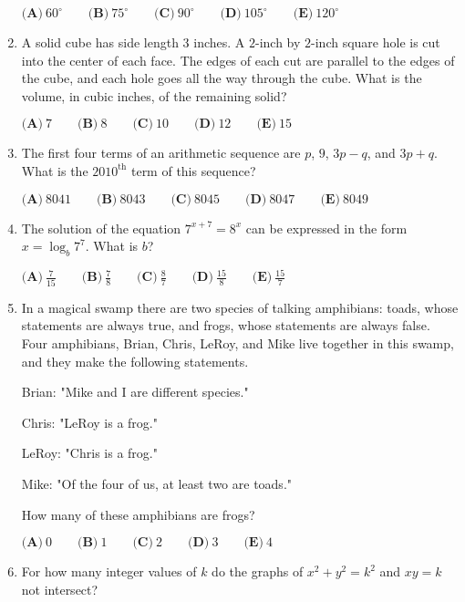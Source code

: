 \documentclass{article}
\begin{document}
\begin{enumerate}[label=\arabic*., itemsep=0.5em]
$\textbf{(A)}\ 60^\circ \qquad \textbf{(B)}\ 75^\circ \qquad \textbf{(C)}\ 90^\circ \qquad \textbf{(D)}\ 105^\circ \qquad \textbf{(E)}\ 120^\circ$\par \vspace{0.5em}\item A solid cube has side length $3$ inches. A $2$-inch by $2$-inch square hole is cut into the center of each face. The edges of each cut are parallel to the edges of the cube, and each hole goes all the way through the cube. What is the volume, in cubic inches, of the remaining solid?

$\textbf{(A)}\ 7 \qquad \textbf{(B)}\ 8 \qquad \textbf{(C)}\ 10 \qquad \textbf{(D)}\ 12 \qquad \textbf{(E)}\ 15$\par \vspace{0.5em}\item The first four terms of an arithmetic sequence are $p$, $9$, $3p-q$, and $3p+q$. What is the $2010^\text{th}$ term of this sequence?

$\textbf{(A)}\ 8041 \qquad \textbf{(B)}\ 8043 \qquad \textbf{(C)}\ 8045 \qquad \textbf{(D)}\ 8047 \qquad \textbf{(E)}\ 8049$\par \vspace{0.5em}\item The solution of the equation $7^{x+7} = 8^x$ can be expressed in the form $x = \log_b 7^7$. What is $b$?

$\textbf{(A)}\ \frac{7}{15} \qquad \textbf{(B)}\ \frac{7}{8} \qquad \textbf{(C)}\ \frac{8}{7} \qquad \textbf{(D)}\ \frac{15}{8} \qquad \textbf{(E)}\ \frac{15}{7}$\par \vspace{0.5em}\item In a magical swamp there are two species of talking amphibians: toads, whose statements are always true, and frogs, whose statements are always false. Four amphibians, Brian, Chris, LeRoy, and Mike live together in this swamp, and they make the following statements.

Brian: "Mike and I are different species."

Chris: "LeRoy is a frog."

LeRoy: "Chris is a frog."

Mike: "Of the four of us, at least two are toads."

How many of these amphibians are frogs?

$\textbf{(A)}\ 0 \qquad \textbf{(B)}\ 1 \qquad \textbf{(C)}\ 2 \qquad \textbf{(D)}\ 3 \qquad \textbf{(E)}\ 4$\par \vspace{0.5em}\item For how many integer values of $k$ do the graphs of $x^2+y^2=k^2$ and $xy = k$ not intersect?


\end{enumerate}
\end{document}
